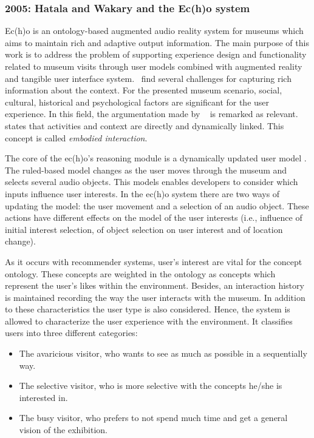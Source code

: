 \subsubsection{2005: Hatala and Wakary and the Ec(h)o system}
\label{sec:hatala}

Ec(h)o is an ontology-based augmented audio reality system for museums which 
aims to maintain rich and adaptive output information. The main purpose of this 
work is to address the problem of supporting experience design and functionality 
related to museum visits through user models combined with augmented reality 
and tangible user interface system.~\citet{hatala_ontology_based_2005} find
several challenges for capturing rich information about the context. For the
presented museum scenario, social, cultural, historical and psychological factors
are significant for the user experience. In this field, the argumentation made by
\citet{dourish_what_2004}~\citep{dourish_where_2004} is remarked as relevant.
\citeauthor{dourish_what_2004} states that activities and context are directly 
and dynamically linked. This concept is called \textit{embodied interaction}.

The core of the ec(h)o's reasoning module is a dynamically updated user model
\citep{wahlster1989user}. The ruled-based model changes as the user moves 
through the museum and selects several audio objects. This models enables 
developers to consider which inputs influence user interests. In the ec(h)o 
system there are two ways of updating the model: the user movement and a 
selection of an audio object. These actions have different effects on the model 
of the user interests (i.e., influence of initial interest selection, of object 
selection on user interest and of location change). 

As it occurs with recommender systems, user's interest are vital for the concept
ontology. These concepts are weighted in the ontology as concepts which represent
the user's likes within the environment. Besides, an interaction history is 
maintained recording the way the user interacts with the museum. In addition to 
these characteristics the user type is also considered. Hence, the system is 
allowed to characterize the user experience with the environment. It classifies 
users into three different categories:

\begin{itemize}
  \item The avaricious visitor, who wants to see as much as possible in a 
  sequentially way.
  \item The selective visitor, who is more selective with the concepts he/she is
  interested in.
  \item The busy visitor, who prefers to not spend much time and get a general
  vision of the exhibition.
\end{itemize}
